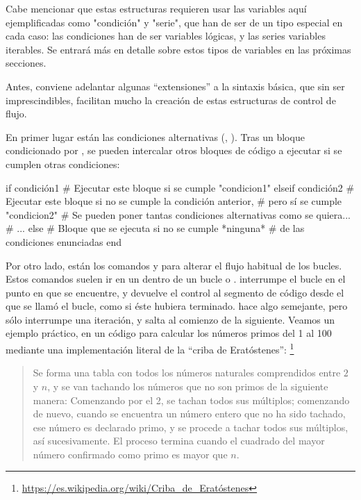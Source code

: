 ﻿\documentclass[spanish]{article}
\begin{document}
Cabe mencionar que estas estructuras requieren usar las variables aquí ejemplificadas como "condición" y "serie", que han de ser de un tipo especial en cada caso: las condiciones han de ser variables lógicas, y las series variables iterables. Se entrará más en detalle sobre estos tipos de variables en las próximas secciones.

Antes, conviene adelantar algunas ``extensiones'' a la sintaxis básica, que sin ser imprescindibles, facilitan mucho la creación de estas estructuras de control de flujo.

En primer lugar están las condiciones alternativas (, ). Tras un bloque condicionado por , se pueden intercalar otros bloques de código a ejecutar si se cumplen otras condiciones:

if condición1
  # Ejecutar este bloque si se cumple "condicion1"
elseif condición2
  # Ejecutar este bloque si no se cumple la condición anterior,
  # pero sí se cumple "condicion2"
  # Se pueden poner tantas condiciones alternativas como se quiera...
  # ...
else
  # Bloque que se ejecuta si no se cumple *ninguna*
  # de las condiciones enunciadas
end

Por otro lado, están los comandos  y  para alterar el flujo habitual de los bucles. Estos comandos suelen ir en un  dentro de un bucle  o .  interrumpe el bucle en el punto en que se encuentre, y devuelve el control al segmento de código desde el que se llamó el bucle, como si éste hubiera terminado.  hace algo semejante, pero sólo interrumpe una iteración, y salta al comienzo de la siguiente. Veamos un ejemplo práctico, en un código para calcular los números primos del 1 al 100 mediante una implementación literal de la ``criba de Eratóstenes'':%
\footnote{%
\url{https://es.wikipedia.org/wiki/Criba_de_Eratóstenes}%
}

\begin{quote}
Se forma una tabla con todos los números naturales comprendidos entre $2$ y $n$, y se van tachando los números que no son primos de la siguiente manera: Comenzando por el 2, se tachan todos sus múltiplos; comenzando de nuevo, cuando se encuentra un número entero que no ha sido tachado, ese número es declarado primo, y se procede a tachar todos sus múltiplos, así sucesivamente. El proceso termina cuando el cuadrado del mayor número confirmado como primo es mayor que $n$.
\end{quote}
\end{document}
